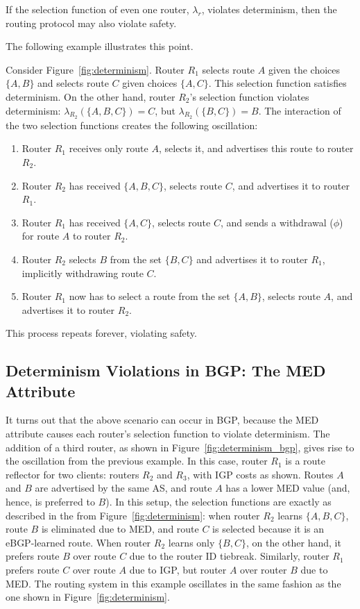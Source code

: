 \begin{observation}
If the selection function of even one router, $\lambda_r$, violates
determinism, then the routing protocol may also violate safety.
\end{observation}

\noindent
The following example illustrates this point.

\begin{example}\label{ex:med_det}
Consider Figure~\ref{fig:determinism}.  Router $R_1$ selects route $A$
given the choices $\{A, B\}$ and selects route $C$ given choices
$\{A,C\}$. This selection function satisfies determinism.
On the other hand, router $R_2$'s selection function violates determinism:
$\lambda_{R_2}(\{A,B,C\}) = C$, but $\lambda_{R_2}(\{B,C\}) = B$.  The
interaction of the two selection functions creates the following
oscillation: 
\begin{enumerate}
\itemsep=-1pt
\item Router $R_1$ receives only route $A$, selects it, and
  advertises this route to router $R_2$.
\item Router $R_2$ has received $\{A,B,C\}$, selects
  route $C$, and advertises it to router $R_1$.
\item Router $R_1$ has received $\{A,C\}$, selects
  route $C$, and sends a withdrawal ($\phi$) for route $A$ to router
  $R_2$. 
\item Router $R_2$ selects $B$ from the set $\{B,C\}$ and advertises it to
  router $R_1$, implicitly withdrawing route $C$. 
\item Router $R_1$ now has to select a route from the set $\{A,B\}$, selects
  route $A$, and advertises it to router $R_2$.
\end{enumerate}
This process repeats forever, violating safety.
\end{example}

\subsection{Determinism Violations in BGP: The MED Attribute}

It turns out that the above scenario can occur in BGP, because the MED
attribute causes each router's selection function to violate
determinism.  The addition of a third router, as shown in
Figure~\ref{fig:determinism_bgp}, gives rise to the oscillation from the
previous example.  In this case, router $R_1$ is a route reflector for
two clients: routers $R_2$ and $R_3$, with IGP costs as shown.  Routes
$A$ and $B$ are advertised by the same AS, and route $A$ has a lower MED
value (and, hence, is preferred to $B$).  In this setup, the selection
functions are exactly as described 
in the from Figure~\ref{fig:determinism}: when router $R_2$ learns $\{A,B,C\}$,
route $B$ is eliminated due to MED, and route $C$ is selected because it
is an eBGP-learned route.  When router $R_2$ learns only $\{B,C\}$, on
the other hand, it prefers route $B$ over route $C$ due to the router ID
tiebreak.  Similarly, router $R_1$ prefers route $C$ over route $A$ due
to IGP, but router $A$ over router $B$ due to MED.  The routing system
in this example oscillates in the same fashion as the one shown in
Figure~\ref{fig:determinism}. 

